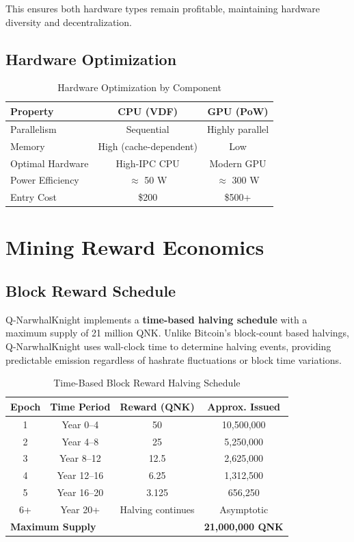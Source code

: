 \documentclass[11pt,a4paper]{article}
\begin{document}
This ensures both hardware types remain profitable, maintaining hardware diversity and decentralization.

\subsection{Hardware Optimization}

\begin{table}[h]
\centering
\caption{Hardware Optimization by Component}
\begin{tabular}{lcc}
\toprule
\textbf{Property} & \textbf{CPU (VDF)} & \textbf{GPU (PoW)} \\
\midrule
Parallelism & Sequential & Highly parallel \\
Memory & High (cache-dependent) & Low \\
Optimal Hardware & High-IPC CPU & Modern GPU \\
Power Efficiency & $\approx$ 50 W & $\approx$ 300 W \\
Entry Cost & \$200 & \$500+ \\
\bottomrule
\end{tabular}
\end{table}

\section{Mining Reward Economics}

\subsection{Block Reward Schedule}

Q-NarwhalKnight implements a \textbf{time-based halving schedule} with a maximum supply of 21 million QNK. Unlike Bitcoin's block-count based halvings, Q-NarwhalKnight uses wall-clock time to determine halving events, providing predictable emission regardless of hashrate fluctuations or block time variations.

\begin{table}[h]
\centering
\caption{Time-Based Block Reward Halving Schedule}
\begin{tabular}{cccc}
\toprule
\textbf{Epoch} & \textbf{Time Period} & \textbf{Reward (QNK)} & \textbf{Approx. Issued} \\
\midrule
1 & Year 0--4 & 50 & 10,500,000 \\
2 & Year 4--8 & 25 & 5,250,000 \\
3 & Year 8--12 & 12.5 & 2,625,000 \\
4 & Year 12--16 & 6.25 & 1,312,500 \\
5 & Year 16--20 & 3.125 & 656,250 \\
6+ & Year 20+ & Halving continues & Asymptotic \\
\midrule
\multicolumn{3}{l}{\textbf{Maximum Supply}} & \textbf{21,000,000 QNK} \\
\bottomrule
\end{tabular}
\end{table}
\end{document}
